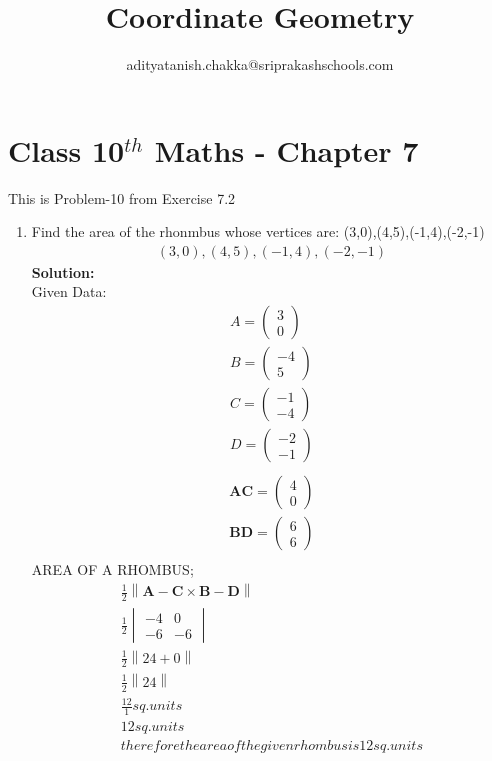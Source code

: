 \documentclass[12pt]{article}
\title{Coordinate Geometry}
\author{adityatanish.chakka@sriprakashschools.com}
\newcommand{\mydet}[1]{\ensuremath{\begin{vmatrix}#1\end{vmatrix}}}
\newcommand{\myvec}[1]{\ensuremath{\begin{pmatrix}#1\end{pmatrix}}}
\newcommand{\solution}{\noindent \textbf{Solution: }}
\providecommand{\norm}[1]{\left\lVert#1\right\rVert}
\let\vec\mathbf
\begin{document}
\maketitle
\section*{Class 10$^{th}$ Maths - Chapter 7}
This is Problem-10 from Exercise 7.2
\begin{enumerate}
\item Find the area of the rhonmbus whose vertices are:
(3,0),(4,5),(-1,4),(-2,-1)
\begin{align}
{(3,0),(4,5),(-1,4),(-2,-1)}
\end{align}
\solution \\
Given Data:
\begin{align}
A = \myvec{3\\0}\\
B = \myvec{-4\\5}\\
C = \myvec{-1\\-4}\\
D = \myvec{-2\\-1}\\
\end{align}
\begin{align}
\vec{AC} = \myvec{4\\0}\\
\vec{BD} = \myvec{6\\6}\\
\end{align}
AREA OF A RHOMBUS;
\begin{align}
\frac{1}{2}\norm{\vec{A}-\vec{C}\times \vec{B}-\vec{D}}\\
\frac{1}{2}\mydet{-4 & 0\\ -6 & -6}\\
\frac{1}{2}\norm{24 + 0}\\
\frac{1}{2}\norm{24}\\
\frac{12}{1} sq.units\\
12 sq.units\\
therefore the area of the given rhombus is 12 sq.units
\end{align}



    

    


\
\end{enumerate}
\end{document}
